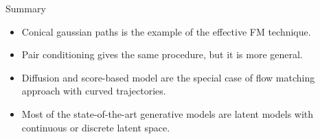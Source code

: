 \begin{frame}{Summary}
	\begin{itemize}
		\item Conical gaussian paths is the example of the effective FM technique.
		\vfill
		\item Pair conditioning gives the same procedure, but it is more general.
		\vfill
		\item Diffusion and score-based model are the special case of flow matching approach with curved trajectories.
		\vfill
		\item Most of the state-of-the-art generative models are latent models with continuous or discrete latent space.
	\end{itemize}
\end{frame}
 